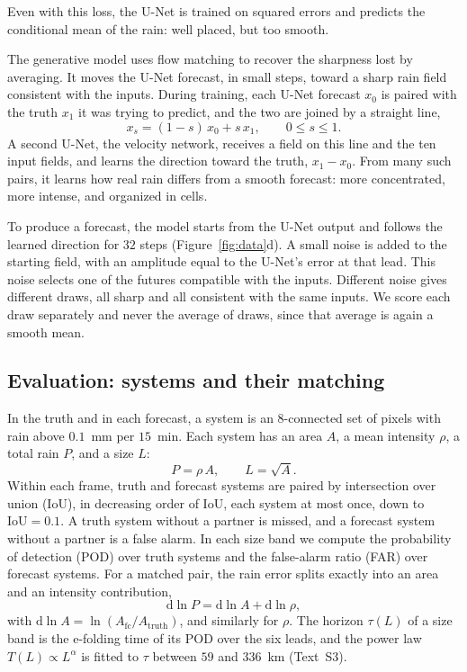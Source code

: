 \documentclass[draft]{agujournal2019}
\begin{document}
Even with this loss, the U-Net is trained on squared errors and predicts
the conditional mean of the rain: well placed, but too smooth.

The generative model uses flow matching \cite{lipman2023, liu2023} to
recover the sharpness lost by averaging. It moves the U-Net forecast, in
small steps, toward a sharp rain field consistent with the inputs. During
training, each U-Net forecast $x_0$ is paired with the truth $x_1$ it was
trying to predict, and the two are joined by a straight line,
\begin{equation}
x_s = (1 - s)\,x_0 + s\,x_1, \qquad 0 \le s \le 1 .
\label{eq:line}
\end{equation}
A second U-Net, the velocity network, receives a field on this line and
the ten input fields, and learns the direction toward the truth,
$x_1 - x_0$. From many such pairs, it learns how real rain differs from a
smooth forecast: more concentrated, more intense, and organized in cells.

To produce a forecast, the model starts from the U-Net output and follows
the learned direction for $32$ steps (Figure~\ref{fig:data}d). A small
noise is added to the starting field, with an amplitude equal to the
U-Net's error at that lead. This noise selects one of the futures
compatible with the inputs. Different noise gives different draws, all
sharp and all consistent with the same inputs. We score each draw separately
and never the average of draws, since that average is again a smooth mean.

\subsection{Evaluation: systems and their matching}
\label{sec:evaluation}

In the truth and in each forecast, a system is an 8-connected set of pixels
with rain above $0.1$~mm per $15$~min. Each system has an area $A$, a mean
intensity $\rho$, a total rain $P$, and a size $L$:
\begin{equation}
P = \rho\,A, \qquad L = \sqrt{A}.
\label{eq:PrhoA}
\end{equation}
Within each frame, truth and forecast systems are paired by intersection
over union (IoU), in decreasing order of IoU, each system at most once,
down to $\mathrm{IoU} = 0.1$. A truth system without a partner is missed,
and a forecast system without a partner is a false alarm. In each size
band we compute the probability of detection (POD) over truth systems and
the false-alarm ratio (FAR) over forecast systems. For a matched pair, the
rain error splits exactly into an area and an intensity contribution,
\begin{equation}
\mathrm{d}\ln P = \mathrm{d}\ln A + \mathrm{d}\ln\rho,
\label{eq:decomp}
\end{equation}
with $\mathrm{d}\ln A = \ln(A_{\mathrm{fc}}/A_{\mathrm{truth}})$, and
similarly for $\rho$. The horizon $\tau(L)$ of a size band is the
e-folding time of its POD over the six leads, and the power law
$T(L) \propto L^{\alpha}$ is fitted to $\tau$ between $59$ and $336$~km
(Text~S3).
\end{document}

